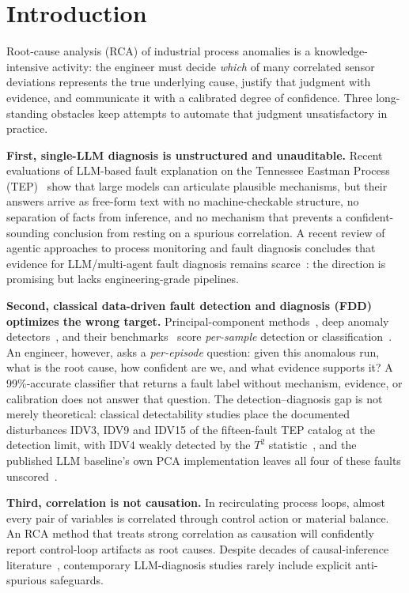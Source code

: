 \documentclass[preprint,12pt]{elsarticle}
\begin{document}
\section{Introduction}
\label{sec:intro}

Root-cause analysis (RCA) of industrial process anomalies is a knowledge-intensive activity: the engineer must decide \emph{which} of many correlated sensor deviations represents the true underlying cause, justify that judgment with evidence, and communicate it with a calibrated degree of confidence. Three long-standing obstacles keep attempts to automate that judgment unsatisfactory in practice.

\textbf{First, single-LLM diagnosis is unstructured and unauditable.} Recent evaluations of LLM-based fault explanation on the Tennessee Eastman Process (TEP)~\cite{khan2024faultexplainer} show that large models can articulate plausible mechanisms, but their answers arrive as free-form text with no machine-checkable structure, no separation of facts from inference, and no mechanism that prevents a confident-sounding conclusion from resting on a spurious correlation. A recent review of agentic approaches to process monitoring and fault diagnosis concludes that evidence for LLM/multi-agent fault diagnosis remains scarce~\cite{agentic2026review}: the direction is promising but lacks engineering-grade pipelines.

\textbf{Second, classical data-driven fault detection and diagnosis (FDD) optimizes the wrong target.} Principal-component methods~\cite{kano2002comparison}, deep anomaly detectors~\cite{tuli2022tranad,pozdnyakov2024adversarial}, and their benchmarks~\cite{rieth2017additional} score \emph{per-sample} detection or classification~\cite{qin2012survey}. An engineer, however, asks a \emph{per-episode} question: given this anomalous run, what is the root cause, how confident are we, and what evidence supports it? A 99\%-accurate classifier that returns a fault label without mechanism, evidence, or calibration does not answer that question. The detection--diagnosis gap is not merely theoretical: classical detectability studies place the documented disturbances IDV3, IDV9 and IDV15 of the fifteen-fault TEP catalog at the detection limit, with IDV4 weakly detected by the $T^2$ statistic~\cite{russell2000delay,chiang2001fault}, and the published LLM baseline's own PCA implementation leaves all four of these faults unscored~\cite{khan2024faultexplainer}.

\textbf{Third, correlation is not causation.} In recirculating process loops, almost every pair of variables is correlated through control action or material balance. An RCA method that treats strong correlation as causation will confidently report control-loop artifacts as root causes. Despite decades of causal-inference literature~\cite{yuan2014root,bauer2007finding}, contemporary LLM-diagnosis studies rarely include explicit anti-spurious safeguards.
\end{document}
